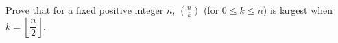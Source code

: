 Prove that for a fixed positive integer $n$, $\binom nk$ (for $0\le k\le n$) is largest when $k=\left\lfloor\dfrac n2\right\rfloor$.
